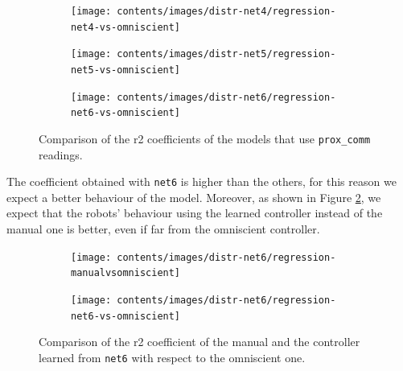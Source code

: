 \begin{figure}[!htb]
	\begin{center}
		\begin{subfigure}[h]{0.45\textwidth}
			\texttt{[image: contents/images/distr-net4/regression-net4-vs-omniscient]}%
		\end{subfigure}
		\hfill
		\begin{subfigure}[h]{0.45\textwidth}
			\texttt{[image: contents/images/distr-net5/regression-net5-vs-omniscient]}%
		\end{subfigure}
	\end{center}
	\begin{center}
		\begin{subfigure}[h]{0.45\textwidth}
			\texttt{[image: contents/images/distr-net6/regression-net6-vs-omniscient]}
		\end{subfigure}
	\end{center}
	\caption[Comparison of the \gls{r2} coefficient for \texttt{prox\_comm} 
	readings.]{Comparison of the \gls{r2} coefficients of the models that use 
	\texttt{prox\_comm} readings.}
	\label{fig:net456r2}
\end{figure}

The coefficient obtained with \texttt{net6} is higher than the others, for this 
reason we expect a better behaviour of the model. Moreover, as shown in Figure 
\ref{fig:net6r2}, we expect that the robots’ behaviour using the learned controller 
instead of the manual one is better, even if far from the omniscient controller.

\begin{figure}[!htb]
	\centering
	\begin{subfigure}[h]{0.49\textwidth}
		\centering
		\texttt{[image: contents/images/distr-net6/regression-manualvsomniscient]}%
	\end{subfigure}
	\hfill
	\begin{subfigure}[h]{0.49\textwidth}
		\centering
		\texttt{[image: contents/images/distr-net6/regression-net6-vs-omniscient]}
	\end{subfigure}
	
	\caption[Evaluation of the \gls{r2} coefficient of \texttt{net6} .]{Comparison of 
		the \gls{r2} coefficient of the manual and the controller learned from 
		\texttt{net6} with respect to the omniscient one.}
	\label{fig:net6r2}
\end{figure}


